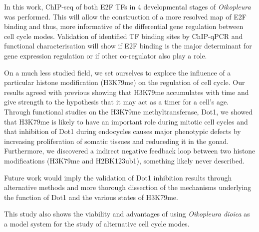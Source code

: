 \documentclass[11pt,twoside,a4paper]{report}
\begin{document}
In this work, ChIP-seq of both E2F TFs in 4 developmental stages of \textit{Oikopleura} was performed. This will allow the construction of a more resolved map of E2F binding and thus, more informative of the differential gene regulation between cell cycle modes. Validation of identified TF binding sites by ChIP-qPCR and functional characterisation will show if E2F binding is the major determinant for gene expression regulation or if other co-regulator also play a role.

On a much less studied field, we set ourselves to explore the influence of a particular histone modification (H3K79me) on the regulation of cell cycle. Our results agreed with previous showing that H3K79me accumulates with time and give strength to the hypothesis that it may act as a timer for a cell's age. Through functional studies on the H3K79me methyltransferase, Dot1, we showed that H3K79me is likely to have an important role during mitotic cell cycles and that inhibition of Dot1 during endocycles causes major phenotypic defects by increasing proliferation of somatic tissues and reduceding it in the gonad. Furthermore, we discovered a indirect negative feedback loop between two histone modifications (H3K79me and H2BK123ub1), something likely never described.

Future work would imply the validation of Dot1 inhibition results through alternative methods and more thorough dissection of the mechanisms underlying the function of Dot1 and the various states of H3K79me.

This study also shows the viability and advantages of using \textit{Oikopleura dioica} as a model system for the study of alternative cell cycle modes.


\cleardoublepage
%
%


\end{document}
